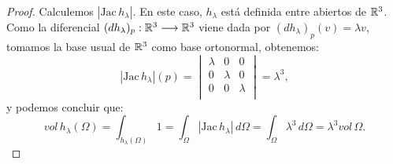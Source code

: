 \begin{proof}
Calculemos $|\text{Jac} \, h_\lambda|$. En este caso, $h_\lambda$ está definida entre abiertos de $\mathbb{R}^3$. Como la diferencial $(dh_\lambda)_p: \mathbb{R}^3 \longrightarrow \mathbb{R}^3$ viene dada por $(dh_\lambda)_p(v) = \lambda v$, tomamos la base usual de $\mathbb{R}^3$ como base ortonormal, obtenemos:
%
\begin{equation*}
  |\text{Jac} \, h_\lambda|(p) = \begin{vmatrix}
                        \lambda & 0 & 0 \\ 
                        0 & \lambda & 0 \\
                        0 & 0 & \lambda \\
                        \end{vmatrix} = \lambda^3,
\end{equation*}
%
y podemos concluir que:
%
\begin{equation*}
    vol \, h_\lambda(\Omega) = \int_{h_\lambda(\Omega)} 1 = \int_{\Omega} |\text{Jac} \, h_\lambda| \, d\Omega = \int_{\Omega} \lambda^3 \, d\Omega = \lambda^3 vol \, \Omega.
\end{equation*}
\end{proof}


